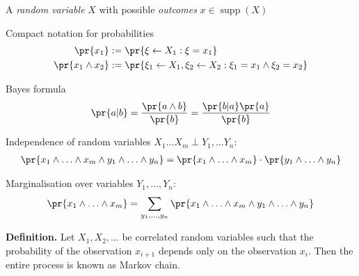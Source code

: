 \documentclass[landscape,footrule]{foils}
\DeclareMathOperator{\supp}{supp}
\begin{document}
\titlefoil



\enlargethispage{0.9cm}
\begin{triangles}
\item A \emph{random variable} $X$ with possible \emph{outcomes} $x\in\supp(X)$
\item Compact notation for probabilities \vspace*{-1ex}
\begin{align*}
\pr{x_1}&:=\pr{\xi\gets X_1: \xi=x_1}\\
\pr{x_1\wedge x_2}&:=\pr{\xi_1\gets X_1,\xi_2\gets X_2 : \xi_1=x_1\wedge \xi_2=x_2}
\end{align*}\vspace*{-4ex}
\item Bayes formula \vspace*{-2ex}
\begin{align*}
\pr{a|b}=\frac{\pr{a\wedge b}}{\pr{b}}=\frac{\pr{b|a}\pr{a}}{\pr{b}}
\end{align*}\vspace*{-4ex}
\item Independence of random variables $X_1\ldots X_m\perp Y_1,\ldots Y_n$: \vspace*{-1ex}
\begin{align*}
 \pr{x_1\wedge\ldots\wedge x_m\wedge y_1\wedge\ldots\wedge y_n}=\pr{x_1\wedge\ldots\wedge x_m}\cdot\pr{y_1\wedge\ldots\wedge y_n}
\end{align*}\vspace*{-4ex}
\item Marginalisation over variables $Y_1,\ldots, Y_n$: \vspace*{-1ex}
\begin{align*}
 \pr{x_1\wedge\ldots\wedge x_m}=\sum_{y_1,\ldots,y_n}\pr{x_1\wedge\ldots\wedge x_m \wedge y_1\wedge\ldots\wedge y_n}
\end{align*} 
\end{triangles}



\textbf{Definition.}
Let $X_1, X_2,\ldots$ be correlated random variables such that the probability of the observation $x_{i+1}$ depends only on the observation $x_{i}$.
Then the entire process is known as Markov chain.

\vspace*{1cm}
\end{document}
